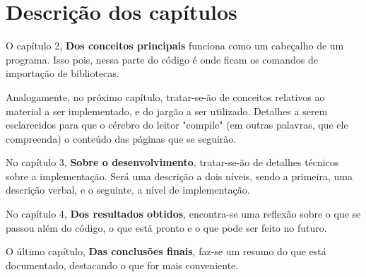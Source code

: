 \section{Descrição dos capítulos}
\label{sec:description}

O capítulo 2, \textbf{Dos conceitos principais} funciona como um cabeçalho de um programa. Isso pois, nessa
parte do código é onde ficam os comandos de importação de bibliotecas.

Analogamente, no próximo capítulo, tratar-se-ão de conceitos relativos ao material a ser implementado, e do
jargão a ser utilizado. Detalhes a serem esclarecidos para que o cérebro do leitor "compile" (em outras palavras,
que ele compreenda) o conteúdo das páginas que se seguirão.

No capítulo 3, \textbf{Sobre o desenvolvimento}, tratar-se-ão de detalhes técnicos sobre a implementação. Será uma
descrição a dois níveis, sendo a primeira, uma descrição verbal, e o seguinte, a nível de implementação.

No capítulo 4, \textbf{Dos resultados obtidos}, encontra-se uma reflexão sobre o que se passou além do código, o que
está pronto e o que pode ser feito no futuro.

O último capítulo, \textbf{Das conclusões finais}, faz-se um resumo do que está documentado, destacando o que for mais
conveniente.


